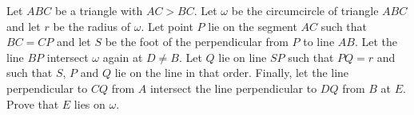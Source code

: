 Let $ABC$ be a triangle with $AC>BC$.
Let $\omega$ be the circumcircle of triangle $ABC$ and let $r$ be the radius of $\omega$.
Let point $P$ lie on the segment $AC$ such that $BC=CP$ and
let $S$ be the foot of the perpendicular from $P$ to line $AB$.
Let the line $BP$ intersect $\omega$ again at $D \neq B$.
Let $Q$ lie on line $SP$ such that $PQ=r$ and such that $S$, $P$ and $Q$ lie on the line in that order.
Finally, let the line perpendicular to $CQ$ from $A$ intersect the line perpendicular to $DQ$ from $B$ at $E$.
Prove that $E$ lies on $\omega$.

